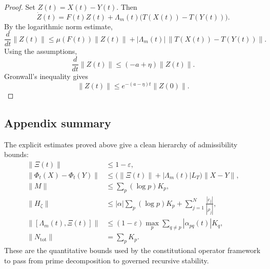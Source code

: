 \documentclass[11pt,a4paper]{article}
\theoremstyle{plain}
\theoremstyle{definition}
\theoremstyle{remark}
\begin{document}
\begin{proof}
Set \(Z(t)=X(t)-Y(t)\). Then
\[
\dot Z(t)=F(t)Z(t)+\Lambda_m(t)\bigl(T(X(t))-T(Y(t))\bigr).
\]
By the logarithmic norm estimate,
\[
\frac{d}{dt}\|Z(t)\|
\le
\mu(F(t))\|Z(t)\| + |\Lambda_m(t)|\,\|T(X(t))-T(Y(t))\|.
\]
Using the assumptions,
\[
\frac{d}{dt}\|Z(t)\|
\le
(-a+\eta)\|Z(t)\|.
\]
Gronwall's inequality gives
\[
\|Z(t)\|
\le
e^{-(a-\eta)t}\|Z(0)\|.
\]
\end{proof}

\subsection{Appendix summary}

The explicit estimates proved above give a clean hierarchy of admissibility bounds:
\begin{align*}
\|\Xi(t)\| &\le 1-\varepsilon,\\
\|\Phi_t(X)-\Phi_t(Y)\| &\le \bigl(\|\Xi(t)\|+|\Lambda_m(t)|L_T\bigr)\|X-Y\|,\\
\|M\| &\le \sum_p (\log p)K_p,\\
\|H_\zeta\| &\le |\alpha|\sum_p (\log p)K_p + \sum_{j=1}^N \frac{|c_j|}{|\rho_j|},\\
\|[\Lambda_m(t),\Xi(t)]\| &\le (1-\varepsilon)\max_p \sum_{q\ne p} |\alpha_{pq}(t)|K_q,\\
\|N_{\mathrm{tot}}\| &= \sum_p K_p.
\end{align*}
These are the quantitative bounds used by the constitutional operator framework to pass from prime decomposition to governed recursive stability.
\nocite{*}
  

\end{document}
